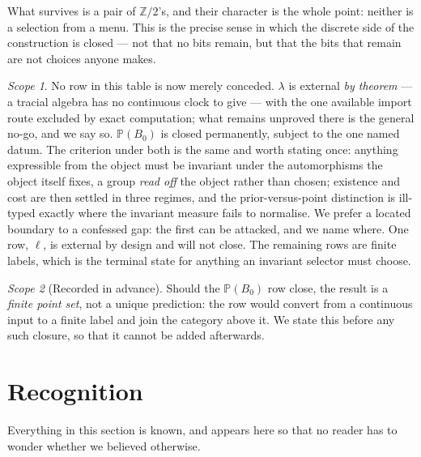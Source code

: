 \documentclass[11pt,a4paper]{article}
\theoremstyle{definition}
\theoremstyle{remark}
\newtheorem{scopenote}{Scope}
\newcommand{\Z}{\mathbb{Z}}
\newcommand{\PP}{\mathbb{P}}
\begin{document}
What survives is a pair of $\Z/2$'s, and their character is the whole point: neither is a selection
from a menu. This is the precise sense in which the discrete side of the construction is closed ---
not that no bits remain, but that the bits that remain are not choices anyone makes.

\begin{scopenote}
No row in this table is now merely conceded. $\lambda$ is external \emph{by theorem} --- a tracial
algebra has no continuous clock to give --- with the one available import route excluded by exact
computation; what remains unproved there is the general no-go, and we say so. $\PP(B_0)$ is closed
permanently, subject to the one named datum. The criterion under both is the same and worth stating
once: anything expressible from the object must be invariant under the automorphisms the object
itself fixes, a group \emph{read off} the object rather than chosen; existence and cost are then
settled in three regimes, and the prior-versus-point distinction is ill-typed exactly where the
invariant measure fails to normalise. We prefer a located boundary to a confessed gap: the first can
be attacked, and we name where. One row, $\ell$, is external by design and will not close. The
remaining rows are finite labels, which is the terminal state for anything an invariant selector
must choose.
\end{scopenote}

\begin{scopenote}[Recorded in advance]
Should the $\PP(B_0)$ row close, the result is a \emph{finite point set}, not a unique prediction: the
row would convert from a continuous input to a finite label and join the category above it. We state
this before any such closure, so that it cannot be added afterwards.
\end{scopenote}

\section{Recognition}\label{sec:recognition}

Everything in this section is known, and appears here so that no reader has to wonder whether we
believed otherwise.
\end{document}
